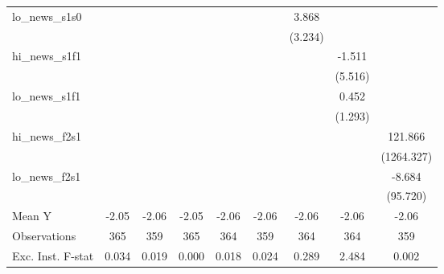 {\begin{tabular}{l*{8}{c}}
\addlinespace
lo\_news\_s1s0&                     &                     &                     &                     &                     &       3.868         &                     &                     \\
            &                     &                     &                     &                     &                     &     (3.234)         &                     &                     \\
\addlinespace
hi\_news\_s1f1&                     &                     &                     &                     &                     &                     &      -1.511         &                     \\
            &                     &                     &                     &                     &                     &                     &     (5.516)         &                     \\
\addlinespace
lo\_news\_s1f1&                     &                     &                     &                     &                     &                     &       0.452         &                     \\
            &                     &                     &                     &                     &                     &                     &     (1.293)         &                     \\
\addlinespace
hi\_news\_f2s1&                     &                     &                     &                     &                     &                     &                     &     121.866         \\
            &                     &                     &                     &                     &                     &                     &                     &  (1264.327)         \\
\addlinespace
lo\_news\_f2s1&                     &                     &                     &                     &                     &                     &                     &      -8.684         \\
            &                     &                     &                     &                     &                     &                     &                     &    (95.720)         \\
\midrule
Mean Y      &       -2.05         &       -2.06         &       -2.05         &       -2.06         &       -2.06         &       -2.06         &       -2.06         &       -2.06         \\
Observations&         365         &         359         &         365         &         364         &         359         &         364         &         364         &         359         \\
Exc. Inst. F-stat&       0.034         &       0.019         &       0.000         &       0.018         &       0.024         &       0.289         &       2.484         &       0.002         \\
\bottomrule
\end{tabular}
}
